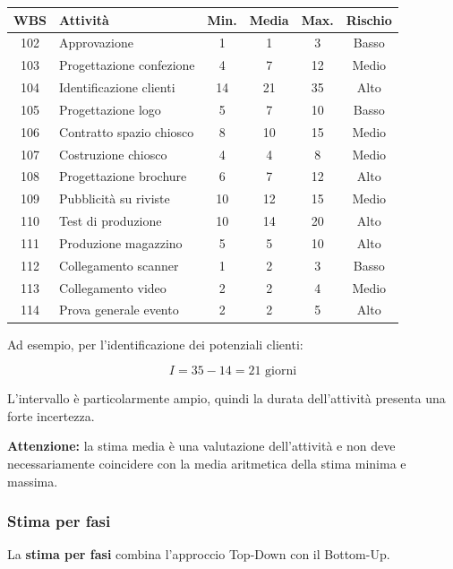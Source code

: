 \begin{center}
\scriptsize
\begin{tabular}{|c|p{3.5cm}|c|c|c|c|}
\hline
\textbf{WBS} & \textbf{Attività} &
\textbf{Min.} & \textbf{Media} &
\textbf{Max.} & \textbf{Rischio} \\
\hline
102 & Approvazione & 1 & 1 & 3 & Basso \\
\hline
103 & Progettazione confezione & 4 & 7 & 12 & Medio \\
\hline
104 & Identificazione clienti & 14 & 21 & 35 & Alto \\
\hline
105 & Progettazione logo & 5 & 7 & 10 & Basso \\
\hline
106 & Contratto spazio chiosco & 8 & 10 & 15 & Medio \\
\hline
107 & Costruzione chiosco & 4 & 4 & 8 & Medio \\
\hline
108 & Progettazione brochure & 6 & 7 & 12 & Alto \\
\hline
109 & Pubblicità su riviste & 10 & 12 & 15 & Medio \\
\hline
110 & Test di produzione & 10 & 14 & 20 & Alto \\
\hline
111 & Produzione magazzino & 5 & 5 & 10 & Alto \\
\hline
112 & Collegamento scanner & 1 & 2 & 3 & Basso \\
\hline
113 & Collegamento video & 2 & 2 & 4 & Medio \\
\hline
114 & Prova generale evento & 2 & 2 & 5 & Alto \\
\hline
\end{tabular}
\end{center}

\noindent Ad esempio, per l'identificazione
dei potenziali clienti:

\[
I=35-14=\boxed{21\text{ giorni}}
\]

\noindent L'intervallo è particolarmente ampio,
quindi la durata dell'attività presenta
una forte incertezza.

\medskip

\noindent \textbf{Attenzione:} la stima media
è una valutazione dell'attività e non deve
necessariamente coincidere con la media
aritmetica della stima minima e massima.

\subsubsection*{Stima per fasi}

\noindent La \textbf{stima per fasi} combina
l'approccio Top-Down con il Bottom-Up.

